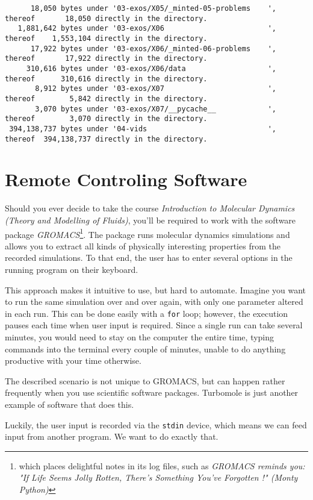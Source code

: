 \documentclass[
	english,
	fontsize=10pt,
	parskip=half,
	titlepage=true,
	DIV=12
]{scrartcl}
\newcommand*{\inPy}[1]{\texttt{#1}}
\begin{document}
\begin{verbatim}
      18,050 bytes under '03-exos/X05/_minted-05-problems    ', thereof       18,050 directly in the directory.
   1,881,642 bytes under '03-exos/X06                        ', thereof    1,553,104 directly in the directory.
      17,922 bytes under '03-exos/X06/_minted-06-problems    ', thereof       17,922 directly in the directory.
     310,616 bytes under '03-exos/X06/data                   ', thereof      310,616 directly in the directory.
       8,912 bytes under '03-exos/X07                        ', thereof        5,842 directly in the directory.
       3,070 bytes under '03-exos/X07/__pycache__            ', thereof        3,070 directly in the directory.
 394,138,737 bytes under '04-vids                            ', thereof  394,138,737 directly in the directory.
\end{verbatim}

\section{Remote Controling Software}
Should you ever decide to take the course \emph{Introduction to Molecular Dynamics (Theory and Modelling of Fluids)}, you'll be required to work with the software package \emph{GROMACS}\footnote{which places delightful notes in its log files, such as \emph{GROMACS reminds you: "If Life Seems Jolly Rotten, There's Something You've Forgotten !" (Monty Python)}}. The package runs molecular dynamics simulations and allows you to extract all kinds of physically interesting properties from the recorded simulations. To that end, the user has to enter several options in the running program on their keyboard.

This approach makes it intuitive to use, but hard to automate. Imagine you want to run the same simulation over and over again, with only one parameter altered in each run. This can be done easily with a \inPy{for} loop; however, the execution pauses each time when user input is required. Since a single run can take several minutes, you would need to stay on the computer the entire time, typing commands into the terminal every couple of minutes, unable to do anything productive with your time otherwise.

The described scenario is not unique to GROMACS, but can happen rather frequently when you use scientific software packages. Turbomole is just another example of software that does this.

Luckily, the user input is recorded via the \texttt{stdin} device, which means we can feed input from another program. We want to do exactly that.
\end{document}
